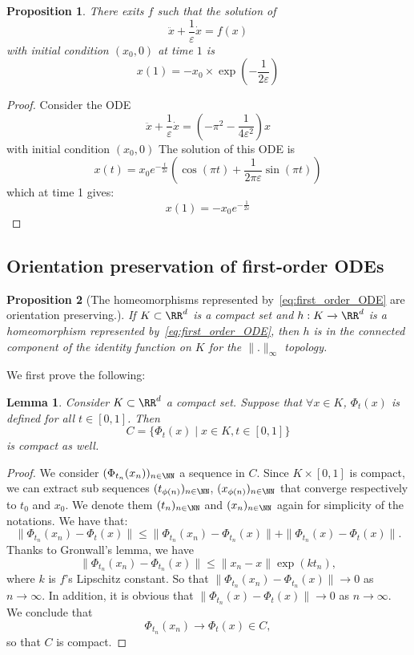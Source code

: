\documentclass{article}
\newtheorem{lemma}{Lemma}
\newtheorem{proposition}{Proposition}
\begin{document}
\begin{proposition}\label{prop:lambda}
There exits $f$ such that the solution of 
$$
     \ddot{x} + \frac{1}{\varepsilon} \dot{x} = f(x)
$$
with initial condition $(x_0,0)$
at time $1$ is
$$
x(1) = -x_0 \times \exp(-\frac{1}{2 \varepsilon})
$$
\end{proposition}

\begin{proof}
Consider the ODE
\begin{equation}
    \ddot{x} + \frac{1}{\varepsilon} \dot{x} = (-\pi^2 - \frac{1}{4\varepsilon^2}) x
\end{equation}
with initial condition $(x_0,0)$
The solution of this ODE is 
$$
x(t) = x_0  e^{-\frac{t}{2 \varepsilon}}(  \cos(\pi  t) + \frac{1}{2\pi \varepsilon}\sin(\pi t))
$$
which at time 1 gives:
$$
x(1) = -x_0 e^{-\frac{1}{2 \varepsilon}}
$$
\end{proof}

\subsection{Orientation preservation of first-order ODEs}\label{app:prop_connected}

\begin{proposition}[The homeomorphisms represented by~\eqref{eq:first_order_ODE} are orientation preserving.]\label{prop:connexe}
If $K \subset \RR^d$ is a compact set and $h : K\xrightarrow{} \RR^d$ is a homeomorphism represented by~\eqref{eq:first_order_ODE}, then $h$ is in the connected component of the identity function on $K$ for the $\|.\|_{\infty}$ topology.
\end{proposition}
We first prove the following: 
\begin{lemma}\label{lemma:compactness}
Consider $K \subset \RR^d$ a compact set. Suppose that $\forall x \in K$, $\Phi_t(x)$ is defined for all $t \in [0,1]$.
Then 
$$
C = \{\Phi_t(x) \mid x \in K, t\in [0,1]\} 
$$
is compact as well.
\end{lemma}
\begin{proof}
We consider $(\Phi_{t_n}(x_n))_{n\in \NN}$ a sequence in $C$. Since $K \times [0,1]$ is compact, we can extract sub sequences $(t_{\phi(n)})_{n\in \NN}$, $(x_{\phi(n)})_{n\in \NN}$ that converge respectively to $t_0$ and $x_0$. We denote them $(t_n)_{n\in \NN}$ and $(x_n)_{n\in \NN}$ again for simplicity of the notations.
We have that:
$$
\|\Phi_{t_n}(x_n)-\Phi_{t}(x)\| \leq \|\Phi_{t_n}(x_n)-\Phi_{t_n}(x)\| + \|\Phi_{t_n}(x)-\Phi_{t}(x)\|.
$$
Thanks to Gronwall's lemma, we have
$$
\|\Phi_{t_n}(x_n)-\Phi_{t_n}(x)\| \leq \|x_n-x\|\exp{(k t_n)},
$$
where $k$ is $f$'s Lipschitz constant. So that $\|\Phi_{t_n}(x_n)-\Phi_{t_n}(x)\|\xrightarrow{} 0$ as $n \xrightarrow{} \infty$.
In addition, it is obvious that $\|\Phi_{t_n}(x)-\Phi_{t}(x)\| \xrightarrow{} 0$ as $n \xrightarrow{} \infty$.
We conclude that
$$
\Phi_{t_n}(x_n) \xrightarrow{} \Phi_{t}(x) \in C,
$$
so that $C$ is compact.
\end{proof}
\end{document}
